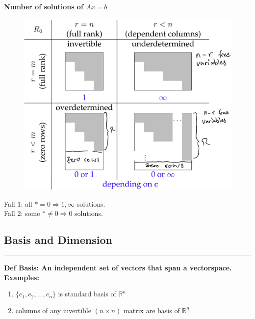 \documentclass[7pt,landscape, margin = 0.1mm]{article}
\newcommand*{\mysubsection}[1]{\vspace{-2mm}\color{chaptercolor}\subsection{ #1 }
\vspace{-1mm}\hrule\vspace{1.5mm}\color{black}
\vspace{2mm}}
\newcommand{\COL}[1]{ \color{chaptercolor} \bf{#1}\color{black}     \\}
\newcommand{\DEF}[2]{\color{chaptercolor}\bf{Def #1}:\color{black}    \hspace{0.2cm} #2}
\begin{document}
\begin{multicols}{4}
\begin{flushleft}
{{\COL{Number of solutions of $Ax=b$}
\hspace{1px}
\begin{figure}[H]
 \centering
 \includegraphics[width=\linewidth,keepaspectratio]{pictures/number_of_solutions.png} 
\end{figure}
Fall 1: all $*=0 \Rightarrow 1, \infty$ solutions.\\
Fall 2: some $*\not=0 \Rightarrow 0$ solutions.

\mysubsection{Basis and Dimension}
\DEF{Basis}{An independent set of vectors that span a vectorspace. Examples:
\begin{enumerate}[nolistsep]
    \item $\{e_1, e_2, ..., e_n\}$ is standard basis of $\mathbb{R}^n$
    \item columns of any invertible $(n\times n)$ matrix are basis of $\mathbb{R}^n$
\end{enumerate}}

}}
\end{flushleft}
\end{multicols}
\end{document}
